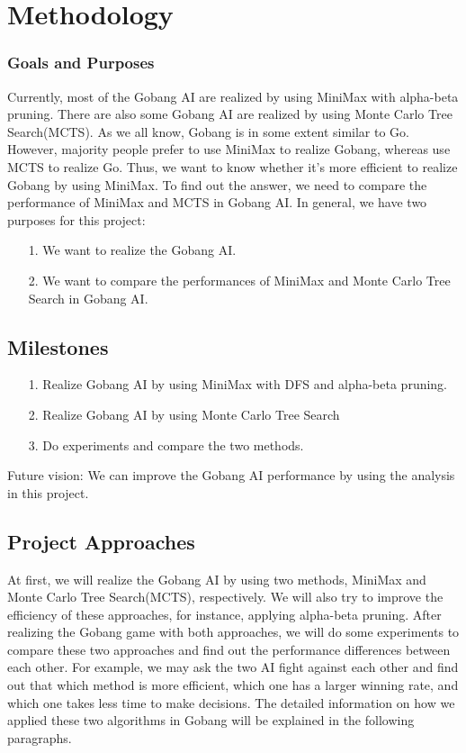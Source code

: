 \documentclass[11pt, a4paper]{article}
\begin{document}
\section{Methodology}

\subsubsection{Goals and Purposes}

Currently, most of the Gobang AI are realized by using MiniMax with alpha-beta pruning. There are also some Gobang AI are realized by using Monte Carlo Tree Search(MCTS). As we all know, Gobang is in some extent similar to Go. However, majority people prefer to use MiniMax to realize Gobang, whereas use MCTS to realize Go. Thus, we want to know whether it’s more efficient to realize Gobang by using MiniMax. To find out the answer, we need to compare the performance of MiniMax and MCTS in Gobang AI. In general, we have two purposes for this project:

\begin{itemize}
\item[1.] We want to realize the Gobang AI. 
\item[2.] We want to compare the performances of MiniMax and Monte Carlo Tree Search in Gobang AI. 

\end{itemize}

\subsection{Milestones}

\begin{itemize}
\item[1.] Realize Gobang AI by using MiniMax with DFS and alpha-beta pruning.

\item[2.] Realize Gobang AI by using Monte Carlo Tree Search
\item[3.] Do experiments and compare the two methods.
\end{itemize}

Future vision: We can improve the Gobang AI performance by using the analysis in this project.

\subsection{Project Approaches}

At first, we will realize the Gobang AI by using two methods, MiniMax and Monte Carlo Tree Search(MCTS), respectively. We will also try to improve the efficiency of these approaches, for instance, applying alpha-beta pruning. After realizing the Gobang game with both approaches, we will do some experiments to compare these two approaches and find out the performance differences between each other. For example, we may ask the two AI fight against each other and find out that which method is more efficient, which one has a larger winning rate, and which one takes less time to make decisions. The detailed information on how we applied these two algorithms in Gobang will be explained in the following paragraphs.
\end{document}
